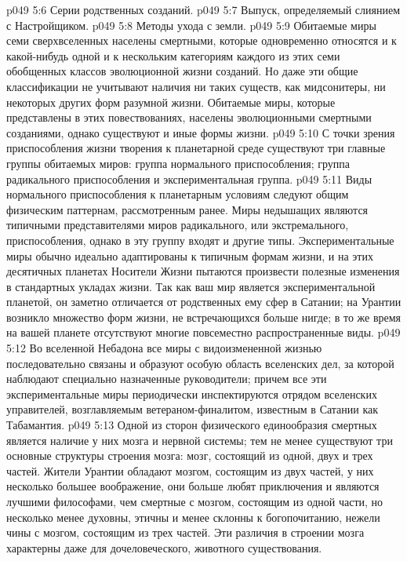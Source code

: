 \vs p049 5:6 \bibnobreakspace Серии родственных созданий.
\vs p049 5:7 \bibnobreakspace Выпуск, определяемый слиянием с Настройщиком.
\vs p049 5:8 \bibnobreakspace Методы ухода с земли.
\vs p049 5:9 \pc Обитаемые миры семи сверхвселенных населены смертными, которые одновременно относятся и к какой\hyp{}нибудь одной и к нескольким категориям каждого из этих семи обобщенных классов эволюционной жизни созданий. Но даже эти общие классификации не учитывают наличия ни таких существ, как мидсонитеры, ни некоторых других форм разумной жизни. Обитаемые миры, которые представлены в этих повествованиях, населены эволюционными смертными созданиями, однако существуют и иные формы жизни.
\vs p049 5:10 \bibnobreakspace {} С точки зрения приспособления жизни творения к планетарной среде существуют три главные группы обитаемых миров: группа нормального приспособления; группа радикального приспособления и экспериментальная группа.
\vs p049 5:11 Виды нормального приспособления к планетарным условиям следуют общим физическим паттернам, рассмотренным ранее. Миры недышащих являются типичными представителями миров радикального, или экстремального, приспособления, однако в эту группу входят и другие типы. Экспериментальные миры обычно идеально адаптированы к типичным формам жизни, и на этих десятичных планетах Носители Жизни пытаются произвести полезные изменения в стандартных укладах жизни. Так как ваш мир является экспериментальной планетой, он заметно отличается от родственных ему сфер в Сатании; на Урантии возникло множество форм жизни, не встречающихся больше нигде; в то же время на вашей планете отсутствуют многие повсеместно распространенные виды.
\vs p049 5:12 Во вселенной Небадона все миры с видоизмененной жизнью последовательно связаны и образуют особую область вселенских дел, за которой наблюдают специально назначенные руководители; причем все эти экспериментальные миры периодически инспектируются отрядом вселенских управителей, возглавляемым ветераном\hyp{}финалитом, известным в Сатании как Табамантия.
\vs p049 5:13 \bibnobreakspace {} Одной из сторон физического единообразия смертных является наличие у них мозга и нервной системы; тем не менее существуют три основные структуры строения мозга: мозг, состоящий из одной, двух и трех частей. Жители Урантии обладают мозгом, состоящим из двух частей, у них несколько большее воображение, они больше любят приключения и являются лучшими философами, чем смертные с мозгом, состоящим из одной части, но несколько менее духовны, этичны и менее склонны к богопочитанию, нежели чины с мозгом, состоящим из трех частей. Эти различия в строении мозга характерны даже для дочеловеческого, животного существования.
